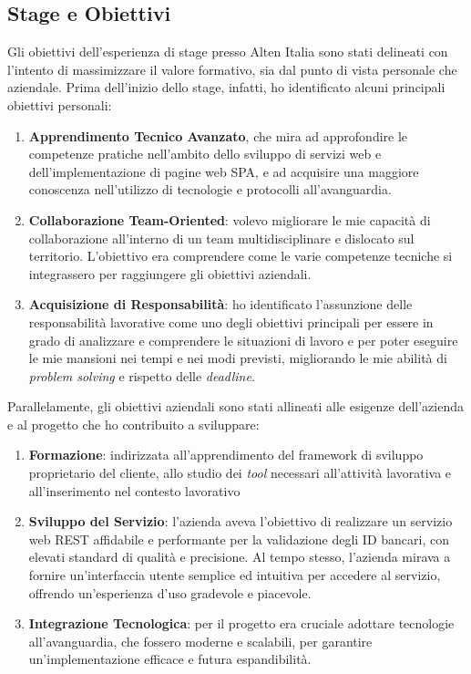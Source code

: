\subsection{Stage e Obiettivi}
Gli obiettivi dell’esperienza di stage presso Alten Italia sono stati delineati con l’intento di massimizzare il valore formativo, sia dal punto di vista personale che aziendale. Prima dell’inizio dello stage, infatti, ho identificato alcuni principali obiettivi personali:
\begin{enumerate}
    \item \textbf{Apprendimento Tecnico Avanzato}, che mira ad approfondire le competenze pratiche nell’ambito dello sviluppo di servizi web e dell’implementazione di pagine web SPA, e ad acquisire una maggiore conoscenza nell’utilizzo di tecnologie e protocolli all’avanguardia.
    \item \textbf{Collaborazione Team-Oriented}: volevo migliorare le mie capacità di collaborazione all’interno di un team multidisciplinare e dislocato sul territorio. L’obiettivo era comprendere come le varie competenze tecniche si integrassero per raggiungere gli obiettivi aziendali.
    \item \textbf{Acquisizione di Responsabilità}: ho identificato l’assunzione delle responsabilità lavorative come uno degli obiettivi principali per essere in grado di analizzare e comprendere le situazioni di lavoro e per poter eseguire le mie mansioni nei tempi e nei modi previsti, migliorando le mie abilità di \textit{problem solving} e rispetto delle \textit{deadline}.
\end{enumerate}

Parallelamente, gli obiettivi aziendali sono stati allineati alle esigenze dell'azienda e al progetto che ho contribuito a sviluppare:
\begin{enumerate}
    \item \textbf{Formazione}: indirizzata all’apprendimento del framework di sviluppo proprietario del cliente, allo studio dei \textit{tool} necessari all’attività lavorativa e all’inserimento nel contesto lavorativo
    \item \textbf{Sviluppo del Servizio}: l’azienda aveva l’obiettivo di realizzare un servizio web REST affidabile e performante per la validazione degli ID bancari, con elevati standard di qualità e precisione. Al tempo stesso, l’azienda mirava a fornire un’interfaccia utente semplice ed intuitiva per accedere al servizio, offrendo un’esperienza d’uso gradevole e piacevole.
    \item \textbf{Integrazione Tecnologica}: per il progetto era cruciale adottare tecnologie all’avanguardia, che fossero moderne e scalabili, per garantire un’implementazione efficace e futura espandibilità.
\end{enumerate}

